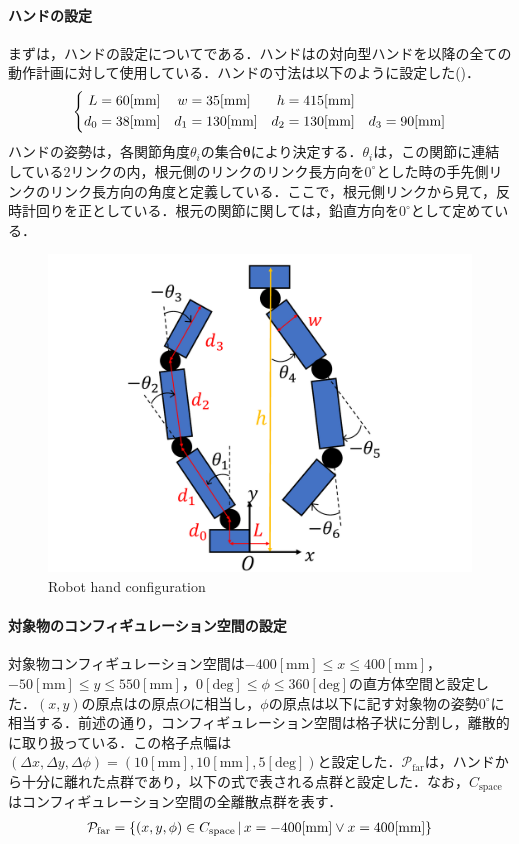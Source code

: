 \documentclass[a4paper,twoside,12pt,papersize, dvipdfmx]{iirthesis}
\begin{document}
\paragraph{ハンドの設定}
まずは，ハンドの設定についてである．ハンドはの対向型ハンドを以降の全ての動作計画に対して使用している．ハンドの寸法は以下のように設定した()．
\begin{gather}
\notag
\left\{
\begin{aligned}
L &= 60 \mathrm{[mm]} & w& = 35 \mathrm{[mm]} & h &= 415 \mathrm{[mm]}\\
d_0 &= 38 \mathrm{[mm]} & d_1 &= 130 \mathrm{[mm]} & d_2 &= 130 \mathrm{[mm]} & d_3 = 90 \mathrm{[mm]}
\end{aligned}
\right .
\end{gather}
ハンドの姿勢は，各関節角度$\theta_i$の集合$\bm {\theta}$により決定する．$\theta_i$は，この関節に連結している2リンクの内，根元側のリンクのリンク長方向を$0^\circ$とした時の手先側リンクのリンク長方向の角度と定義している．ここで，根元側リンクから見て，反時計回りを正としている．根元の関節に関しては，鉛直方向を$0^\circ$として定めている．
\begin{figure}[b]
\centering
\includegraphics[width=0.7\hsize]{fig/3-new-planner/handsize.pdf}
\caption{Robot hand configuration}\label{fig::planner::handsize}
\end{figure}

\paragraph{対象物のコンフィギュレーション空間の設定}
対象物コンフィギュレーション空間は$-400 \mathrm{[mm]} \leq x \leq 400 \mathrm{[mm]}$，$-50 \mathrm{[mm]} \leq y \leq 550 \mathrm{[mm]}$，$0 \mathrm{[deg]} \leq \phi \leq 360 \mathrm{[deg]}$の直方体空間と設定した．$(x,y)$の原点はの原点$O$に相当し，$\phi$の原点は以下に記す対象物の姿勢$0^\circ$に相当する．前述の通り，コンフィギュレーション空間は格子状に分割し，離散的に取り扱っている．この格子点幅は$(\Delta x, \Delta y, \Delta \phi) = (10 \mathrm{[mm]}, 10 \mathrm{[mm]}, 5 \mathrm{[deg]})$と設定した．$\mathcal{P}_{\mathrm {far}}$は，ハンドから十分に離れた点群であり，以下の式で表される点群と設定した．なお，$C_{\mathrm {space}}$はコンフィギュレーション空間の全離散点群を表す．
\begin{gather}
\notag
\mathcal{P}_{\mathrm {far}} = \{ (x, y, \phi) \in C_{\mathrm {space}} \,|\, x = -400 \mathrm{[mm]} \lor x = 400 \mathrm{[mm]} \}
\end{gather}
\end{document}
